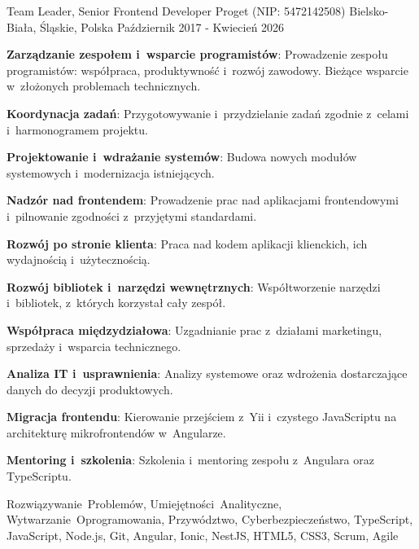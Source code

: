\begin{cventries}
\cventry
{Team Leader, Senior Frontend Developer} %
{Proget (NIP: 5472142508)} %
{Bielsko-Biała, Śląskie, Polska} %
{Październik 2017 - Kwiecień 2026} %
{
  \begin{cvitems} %
    \item {\textbf{Zarządzanie zespołem i~wsparcie programistów}: Prowadzenie zespołu programistów: współpraca, produktywność i~rozwój zawodowy. Bieżące wsparcie w~złożonych problemach technicznych.}
    \item {\textbf{Koordynacja zadań}: Przygotowywanie i~przydzielanie zadań zgodnie z~celami i~harmonogramem projektu.}
    \item {\textbf{Projektowanie i~wdrażanie systemów}: Budowa nowych modułów systemowych i~modernizacja istniejących.}
    \item {\textbf{Nadzór nad frontendem}: Prowadzenie prac nad aplikacjami frontendowymi i~pilnowanie zgodności z~przyjętymi standardami.}
    \item {\textbf{Rozwój po stronie klienta}: Praca nad kodem aplikacji klienckich, ich wydajnością i~użytecznością.}
    \item {\textbf{Rozwój bibliotek i~narzędzi wewnętrznych}: Współtworzenie narzędzi i~bibliotek, z~których korzystał cały zespół.}
    \item {\textbf{Współpraca międzydziałowa}: Uzgadnianie prac z~działami marketingu, sprzedaży i~wsparcia technicznego.}
    \item {\textbf{Analiza IT i~usprawnienia}: Analizy systemowe oraz wdrożenia dostarczające danych do decyzji produktowych.}
    \item {\textbf{Migracja frontendu}: Kierowanie przejściem z~Yii i~czystego JavaScriptu na architekturę mikrofrontendów w~Angularze.}
    \item {\textbf{Mentoring i~szkolenia}: Szkolenia i~mentoring zespołu z~Angulara oraz TypeScriptu.}
  \end{cvitems}
}
{Rozwiązywanie~Problemów, Umiejętności~Analityczne, Wytwarzanie~Oprogramowania, Przywództwo, Cyberbezpieczeństwo, TypeScript, JavaScript, Node.js, Git, Angular, Ionic, NestJS, HTML5, CSS3, Scrum, Agile}


\end{cventries}
